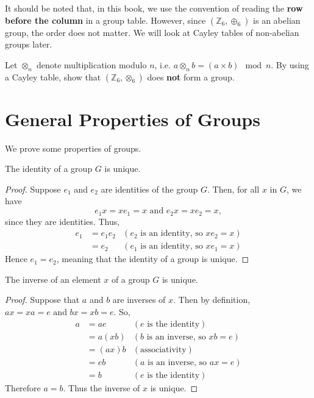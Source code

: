 It should be noted that, in this book, we use the convention of reading the \textbf{row before the column} in a group table. However, since $(\mathbb{Z}_6, \oplus_6)$ is an abelian group, the order does not matter. We will look at Cayley tables of non-abelian groups later.

\begin{exercise}
    Let $\otimes_n$ denote multiplication modulo $n$, i.e. $a \otimes_n b = (a \times b) \mod{n}$. By using a Cayley table, show that $(\mathbb{Z}_6, \otimes_6)$ does \textbf{not} form a group.
\end{exercise}

\section{General Properties of Groups}
We prove some properties of groups.
\begin{proposition}
    The identity of a group $G$ is unique.
\end{proposition}
\begin{proof}
    Suppose $e_1$ and $e_2$ are identities of the group $G$. Then, for all $x$ in $G$, we have
    \[
        e_1x = xe_1 = x \text{ and } e_2x = xe_2 = x,
    \]
    since they are identities. Thus,
    \begin{align*}
        e_1 &= e_1e_2 & (e_2 \text{ is an identity, so } xe_2 = x)\\
        &= e_2 & (e_1 \text{ is an identity, so } xe_1 = x)
    \end{align*}
    Hence $e_1 = e_2$, meaning that the identity of a group is unique.
\end{proof}

\begin{proposition}
    The inverse of an element $x$ of a group $G$ is unique.
\end{proposition}
\begin{proof}
    Suppose that $a$ and $b$ are inverses of $x$. Then by definition, $ax = xa = e \text{ and } bx = xb = e$. So,
    \begin{align*}
        a &= ae & (e \text{ is the identity})\\
        &= a(xb) & (b \text{ is an inverse, so } xb = e)\\
        &= (ax)b & (\text{associativity})\\
        &= eb & (a \text{ is an inverse, so } ax = e)\\
        &= b & (e \text{ is the identity})
    \end{align*}
    Therefore $a = b$. Thus the inverse of $x$ is unique.
\end{proof}

